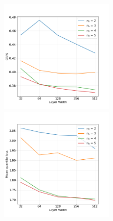\documentclass[amt, manuscript]{copernicus}
\begin{document}
\begin{figure}[t]
	\centering
	\includegraphics[height=57mm]{Figures/CRPS.png} 
	\includegraphics[height=57mm]{Figures/quantile_loss.png}
	\caption{}
	\label{fig:}	
\end{figure}
\end{document}

